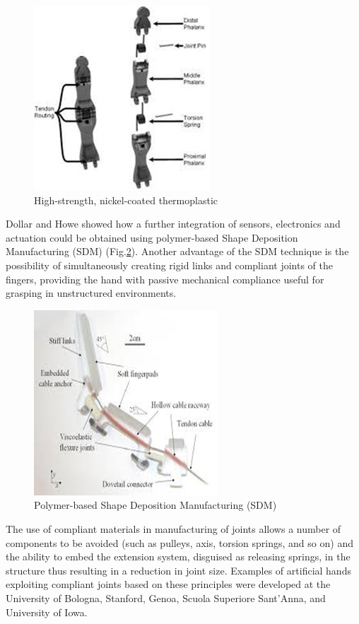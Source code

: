 \documentclass[a4paper, 10pt, conference]{ieeeconf}      %
\begin{document}
\begin{figure}[h!]
\centering  \includegraphics[scale=0.7]{./images/NickelCoated}
  \caption{High-strength, nickel-coated thermoplastic}
  \label{fig:NickelCoated}
	\end{figure}
Dollar and Howe \cite{dollar2010highly} showed how a further integration of sensors, electronics and actuation could be obtained using polymer-based Shape Deposition Manufacturing (SDM) (Fig.\ref{fig:ShapeDepositionManufacturing}). Another advantage of the SDM technique is the possibility of simultaneously creating rigid links and compliant joints of the fingers, providing the hand with passive mechanical compliance useful for grasping in unstructured environments.\\
\begin{figure}[h!]
\centering  \includegraphics[scale=0.7]{./images/ShapeDepositionManufacturing}
  \caption{Polymer-based Shape Deposition Manufacturing (SDM)}
  \label{fig:ShapeDepositionManufacturing}
	\end{figure}
The use of compliant materials in manufacturing of joints allows a number of components to be avoided (such as pulleys, axis, torsion springs, and so on) and the ability to embed the extension system, disguised as releasing springs, in the structure thus resulting in a reduction in joint size. Examples of artificial hands exploiting compliant joints based on these principles were developed at the University of Bologna, Stanford, Genoa, Scuola Superiore Sant’Anna, and University of Iowa.\\
\end{document}
